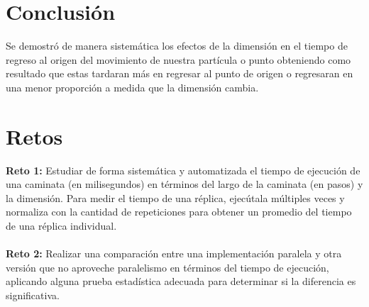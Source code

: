 \documentclass[a4paper]{article}
\begin{document}
\newpage
\section{Conclusión}
\justify
Se demostró de manera sistemática los efectos de la dimensión en el tiempo de regreso al origen del movimiento de nuestra partícula o punto obteniendo como resultado que estas tardaran más en regresar al punto de origen o regresaran en una menor proporción a medida que la dimensión cambia.

\newpage
\section{Retos}

\justify
\textbf{Reto 1:} Estudiar de forma sistemática y automatizada el tiempo de ejecución de una caminata (en milisegundos) en términos del largo de la caminata (en pasos) y la dimensión. Para medir el tiempo de una réplica, ejecútala múltiples veces y normaliza con la cantidad de repeticiones para obtener un promedio del tiempo de una réplica individual.\cite{ejemplo}  %
\\
\\
\justify
\textbf{Reto 2:} Realizar una comparación entre una implementación paralela y otra versión que no aproveche paralelismo en términos del tiempo de ejecución, aplicando alguna prueba estadística adecuada para determinar si la diferencia es significativa.\cite{ejemplo}  %

\clearpage
\end{document}
